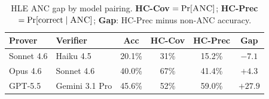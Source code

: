 \begin{table}[h]
\centering
\caption{HLE ANC gap by model pairing. \textbf{HC-Cov} $= \Pr[\textsc{ANC}]$; \textbf{HC-Prec} $= \Pr[\text{correct} \mid \textsc{ANC}]$; \textbf{Gap}: HC-Prec minus non-ANC accuracy.}
\label{tab:hle-capability}
\small
\begin{tabular}{llcccc}
\toprule
\textbf{Prover} & \textbf{Verifier} & \textbf{Acc} & \textbf{HC-Cov} & \textbf{HC-Prec} & \textbf{Gap} \\
\midrule
Sonnet 4.6 & Haiku 4.5 & 20.1\% & 31\% & 15.2\% & $-7.1$ \\
Opus 4.6 & Sonnet 4.6 & 40.0\% & 67\% & 41.4\% & $+4.3$ \\
GPT-5.5 & Gemini 3.1 Pro & 45.6\% & 52\% & 59.0\% & $+27.9$ \\
\bottomrule
\end{tabular}
\end{table}
